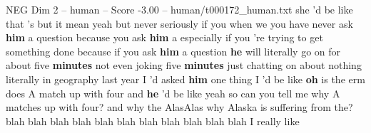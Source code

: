 \begin{textsample}{NEG Dim 2 – human – Score -3.00 – human/t000172\_human.txt}  \label{ex:f2_neg_005}
she 'd be like that 's but it mean yeah but never seriously if you when we you have never ask \textbf{him} a question because you ask \textbf{him} a especially if you 're trying to get something done because if you ask \textbf{him} a question \textbf{he} will literally go on for about five \textbf{minutes} not even joking five \textbf{minutes} just chatting on about nothing literally in geography last year I 'd asked \textbf{him} one thing I 'd be like \textbf{oh} is the erm does A match up with four and \textbf{he} 'd be like yeah so can you tell me why A matches up with four? and why the AlasAlas why Alaska is suffering from the? blah blah blah blah blah blah blah blah blah blah blah I really like

\end{textsample}
